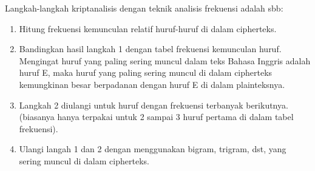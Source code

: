 \documentclass{article}
\begin{document}

Langkah-langkah kriptanalisis dengan teknik analisis frekuensi adalah sbb:

\begin{enumerate}
  \item Hitung frekuensi kemunculan relatif huruf-huruf di dalam cipherteks.
  \item Bandingkan hasil langkah 1 dengan tabel frekuensi kemunculan huruf. Mengingat huruf yang paling sering muncul dalam teks Bahasa Inggris adalah huruf E, maka huruf yang paling sering muncul di dalam cipherteks kemungkinan besar berpadanan dengan huruf E di dalam plainteksnya.
  \item Langkah 2 diulangi untuk huruf dengan frekuensi terbanyak berikutnya. (biasanya hanya terpakai untuk 2 sampai 3 huruf pertama di dalam tabel frekuensi).
  \item Ulangi langah 1 dan 2 dengan menggunakan bigram, trigram, dst, yang sering muncul di dalam cipherteks.
\end{enumerate}
\end{document}
